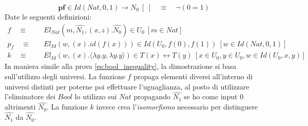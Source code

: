 \begin{displaymath}
    \textbf{pf} \in Id(Nat, 0, 1) \rightarrow N_0\ [\ ]\quad \equiv\quad \neg (0 = 1)
\end{displaymath}
Date le seguenti definizioni:
\begin{align*}
    f\quad \equiv&\quad El_{Nat}(m, \hat{N_1}, (x, z).\hat{N_0}) \in U_0\ [m \in Nat]\\
    p_f\quad \equiv&\quad El_{Id}(w, (x).id(f(x))) \in Id(U_0, f(0), f(1))\ [w \in Id(Nat, 0, 1)]\\
    k\quad \equiv&\quad El_{Id}(w, (x).\langle \lambda y.y, \lambda y.y \rangle) \in T(x) \leftrightarrow T(y)\ [x \in U_0, y \in U_0, w \in Id(U_0, x, y)]
\end{align*}
In maniera simile alla prova \ref{es:bool_inequality}, la dimostrazione si basa sull'utilizzo degli universi.
La funzione $f$ propaga elementi diversi all'interno di universi distinti per poterne poi effettuare l'uguaglianza, al posto di utilizzare l'eliminatore dei $Bool$ lo utilizzo sui $Nat$ propagando $\hat{N_1}$ se ho come input $0$ altrimenti $\hat{N_0}$.
La funzione $k$ invece crea l'\textit{isomorfismo} necessario per distinguere $\hat{N_1}$ da $\hat{N_0}$.
